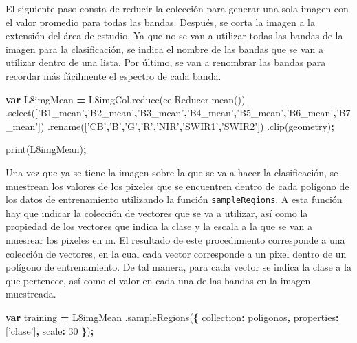 \documentclass[
]{article}
\newenvironment{Shaded}{\begin{snugshade}}{\end{snugshade}}
\newcommand{\AttributeTok}[1]{\textcolor[rgb]{0.77,0.63,0.00}{#1}}
\newcommand{\DataTypeTok}[1]{\textcolor[rgb]{0.13,0.29,0.53}{#1}}
\newcommand{\DecValTok}[1]{\textcolor[rgb]{0.00,0.00,0.81}{#1}}
\newcommand{\KeywordTok}[1]{\textcolor[rgb]{0.13,0.29,0.53}{\textbf{#1}}}
\newcommand{\NormalTok}[1]{#1}
\newcommand{\OperatorTok}[1]{\textcolor[rgb]{0.81,0.36,0.00}{\textbf{#1}}}
\newcommand{\StringTok}[1]{\textcolor[rgb]{0.31,0.60,0.02}{#1}}
\newcommand{\VariableTok}[1]{\textcolor[rgb]{0.00,0.00,0.00}{#1}}
\begin{document}
El siguiente paso consta de reducir la colección para generar una sola
imagen con el valor promedio para todas las bandas. Después, se corta la
imagen a la extensión del área de estudio. Ya que no se van a utilizar
todas las bandas de la imagen para la clasificación, se indica el nombre
de las bandas que se van a utilizar dentro de una lista. Por último, se
van a renombrar las bandas para recordar más fácilmente el espectro de
cada banda.

\begin{Shaded}
\begin{Highlighting}[]
\KeywordTok{var}\NormalTok{ L8imgMean }\OperatorTok{=} \VariableTok{L8imgCol}\NormalTok{.}\AttributeTok{reduce}\NormalTok{(}\VariableTok{ee}\NormalTok{.}\VariableTok{Reducer}\NormalTok{.}\AttributeTok{mean}\NormalTok{())}
\NormalTok{  .}\AttributeTok{select}\NormalTok{([}\StringTok{'B1_mean'}\OperatorTok{,}\StringTok{'B2_mean'}\OperatorTok{,}\StringTok{'B3_mean'}\OperatorTok{,}\StringTok{'B4_mean'}\OperatorTok{,}\StringTok{'B5_mean'}\OperatorTok{,}\StringTok{'B6_mean'}\OperatorTok{,}\StringTok{'B7_mean'}\NormalTok{])}
\NormalTok{  .}\AttributeTok{rename}\NormalTok{([}\StringTok{'CB'}\OperatorTok{,}\StringTok{'B'}\OperatorTok{,}\StringTok{'G'}\OperatorTok{,}\StringTok{'R'}\OperatorTok{,}\StringTok{'NIR'}\OperatorTok{,}\StringTok{'SWIR1'}\OperatorTok{,}\StringTok{'SWIR2'}\NormalTok{])}
\NormalTok{  .}\AttributeTok{clip}\NormalTok{(geometry)}\OperatorTok{;}

\AttributeTok{print}\NormalTok{(L8imgMean)}\OperatorTok{;}
\end{Highlighting}
\end{Shaded}

Una vez que ya se tiene la imagen sobre la que se va a hacer la
clasificación, se muestrean los valores de los pixeles que se encuentren
dentro de cada polígono de los datos de entrenamiento utilizando la
función \texttt{sampleRegions}. A esta función hay que indicar la
colección de vectores que se va a utilizar, así como la propiedad de los
vectores que indica la clase y la escala a la que se van a muesrear los
pixeles en m. El resultado de este procedimiento corresponde a una
colección de vectores, en la cual cada vector corresponde a un pixel
dentro de un polígono de entrenamiento. De tal manera, para cada vector
se indica la clase a la que pertenece, así como el valor en cada una de
las bandas en la imagen muestreada.

\begin{Shaded}
\begin{Highlighting}[]
\KeywordTok{var}\NormalTok{ training }\OperatorTok{=}\NormalTok{ L8imgMean}
\NormalTok{  .}\AttributeTok{sampleRegions}\NormalTok{(}\OperatorTok{\{}
    \DataTypeTok{collection}\OperatorTok{:}\NormalTok{ polígonos}\OperatorTok{,}
    \DataTypeTok{properties}\OperatorTok{:}\NormalTok{ [}\StringTok{'clase'}\NormalTok{]}\OperatorTok{,}
    \DataTypeTok{scale}\OperatorTok{:} \DecValTok{30}
  \OperatorTok{\}}\NormalTok{)}\OperatorTok{;}
\end{Highlighting}
\end{Shaded}
\end{document}
